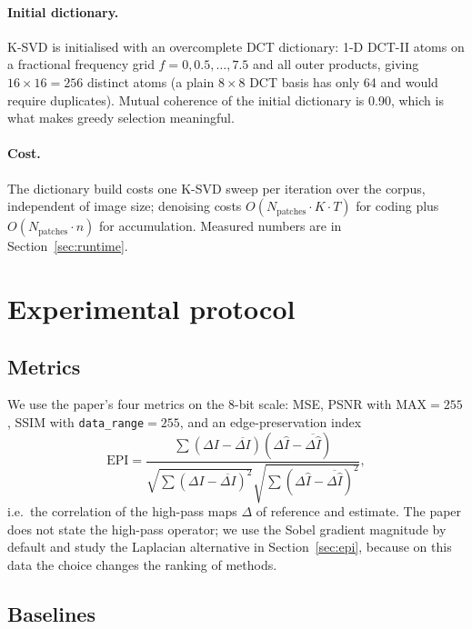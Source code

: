 \documentclass[11pt,a4paper]{article}
\begin{document}
\paragraph{Initial dictionary.}
K-SVD is initialised with an overcomplete DCT dictionary: 1-D DCT-II atoms on a fractional frequency grid
$f=0,0.5,\dots,7.5$ and all outer products, giving $16\times16=256$ distinct atoms (a plain $8\times8$ DCT basis has
only 64 and would require duplicates). Mutual coherence of the initial dictionary is 0.90, which is what makes
greedy selection meaningful.

\paragraph{Cost.}
The dictionary build costs one K-SVD sweep per iteration over the corpus, independent of image size; denoising costs
$O(N_{\text{patches}}\cdot K\cdot T)$ for coding plus $O(N_{\text{patches}}\cdot n)$ for accumulation. Measured
numbers are in Section~\ref{sec:runtime}.

\section{Experimental protocol}\label{sec:protocol}

\subsection{Metrics}

We use the paper's four metrics on the 8-bit scale: MSE, PSNR with $\mathrm{MAX}=255$, SSIM with
\texttt{data\_range}$=255$, and an edge-preservation index
\begin{equation}
\mathrm{EPI}=\frac{\sum(\Delta I-\overline{\Delta I})(\Delta \hat I-\overline{\Delta \hat I})}
{\sqrt{\sum(\Delta I-\overline{\Delta I})^2}\sqrt{\sum(\Delta \hat I-\overline{\Delta \hat I})^2}},
\end{equation}
i.e.\ the correlation of the high-pass maps $\Delta$ of reference and estimate. The paper does not state the
high-pass operator; we use the Sobel gradient magnitude by default and study the Laplacian alternative in
Section~\ref{sec:epi}, because on this data the choice changes the ranking of methods.

\subsection{Baselines}
\end{document}
